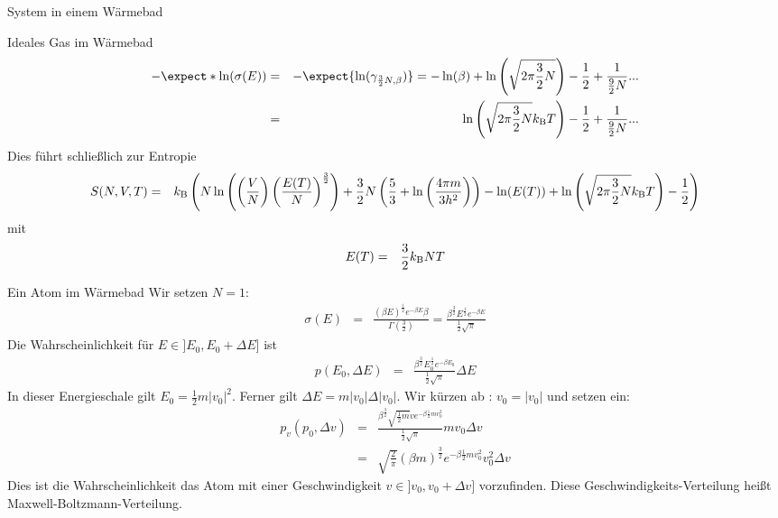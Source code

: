 \begin{chapter}{\titlestr}
\begin{section}{System in einem Wärmebad}
\begin{subsection}{Ideales Gas im Wärmebad}
\begin{eqnarray*}
-\expect*{\ln(\sigma(E))} &=& -\expect{\ln(\gamma_{\frac{3}{2}N,\beta})}=-\ln(\beta)+\ln\left(\sqrt{2\pi \frac{3}{2}N}\right)-\frac{1}{2}+\frac{1}{\frac{9}{2}N}...\\
&=& \ln\left(\sqrt{2\pi \frac{3}{2}N}\kb T\right)-\frac{1}{2}+\frac{1}{\frac{9}{2}N}...
\end{eqnarray*}
Dies führt schließlich zur Entropie
\begin{eqnarray}
\label{canonic_ideal_entropy}
S(N,V,T) &=&k_{\mathrm{B}}\left( N \ln \left( \left(\frac VN\right) \left(\frac{E(T)}{N} \right)^{\frac 32}\right)+ {\frac 32}N\left( {\frac 53}+ \ln\left(\frac{4\pi m}{3h^2}\right)\right)-\ln(E(T))+\ln\left(\sqrt{2\pi \frac{3}{2}N}k_{\mathrm{B}} T\right)-\frac{1}{2}\right)\cr
\end{eqnarray}
mit
\begin{eqnarray*}
E(T) &=& \frac{3}{2}k_{\mathrm{B}} NT
\end{eqnarray*}

\end{subsection}

\begin{subsection}{Ein Atom im Wärmebad}
Wir setzen $N=1$:
\begin{eqnarray*}
\sigma(E)&=& \frac{(\beta E)^\frac{1}{2}e^{-\beta E}\beta}{\Gamma\left(\frac{3}{2}\right)}
=\frac{\beta^\frac{3}{2}E^\frac{1}{2}e^{-\beta E}}{\frac{1}{2}\sqrt{\pi}}
\end{eqnarray*}
Die Wahrscheinlichkeit für $E\in]E_0,E_0+\Delta E]$ ist
\begin{eqnarray*}
p(E_0,\Delta E)&=& \frac{\beta^\frac{3}{2}E_0^\frac{1}{2}e^{-\beta E_0}}{\frac{1}{2}\sqrt{\pi}}\Delta E
\end{eqnarray*}
In dieser Energieschale gilt $E_0=\frac{1}{2}m|v_0|^2$. Ferner gilt $\Delta E=m|v_0|\Delta |v_0|$.
Wir kürzen ab : $v_0=|v_0|$ und setzen ein:
\begin{eqnarray*}
p_v(p_0,\Delta v) &=& \frac{\beta^\frac{3}{2}\sqrt{\frac{1}{2}m}ve^{-\beta \frac{1}{2}mv_0^2}}{\frac{1}{2}\sqrt{\pi}}mv_0\Delta v\\
&=& \sqrt{\frac{2}{\pi}}(\beta m)^\frac{3}{2}e^{-\beta \frac{1}{2}mv_0^2}v_0^2\Delta v
\end{eqnarray*}
Dies ist die Wahrscheinlichkeit das Atom mit einer Geschwindigkeit $v\in ]v_0,v_0+\Delta v]$ vorzufinden.
Diese Geschwindigkeits-Verteilung heißt Maxwell-Boltzmann-Verteilung.
\end{subsection}


\end{section}
\end{chapter}
